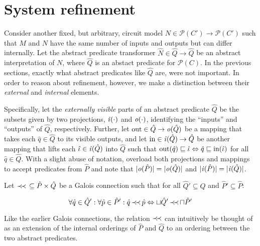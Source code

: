 \section{System refinement}


Consider another fixed, but arbitrary, circuit model $N \in \mathcal{P}(C') \rightarrow \mathcal{P}(C')$ such that $M$ and $N$ have the same number of inputs and outputs but can differ internally. Let the abstract predicate transformer $\hat N \in \hat Q \rightarrow \hat Q$ be an abstract interpretation of $N$, where $\hat Q$ is an abstact predicate for $\mathcal{P}(C)$. In the previous sections, exactly what abstract predicates like $\hat Q$ are, were not important. In order to reason about refinement, however, we  make a distinction between their \textit{external} and \textit{internal} elements.

Specifically, let the \textit{externally visible} parts of an abstract predicate $\hat Q$ be the subsets given by two projections, $\mathit{i}(\cdot)$ and $\mathit{o}(\cdot)$, identifying the ``inputs'' and ``outputs'' of $\hat Q$, respectively. Further, let $\operatorname{out} \in \hat Q \rightarrow \mathit{o}(\hat Q)$ be a mapping that takes each $\hat q \in \hat Q$ to its visible outputs, and let $\operatorname{in} \in \mathit{i}(\hat Q) \rightarrow \hat Q$ be another mapping that lifts each $\hat \iota \in \mathit{i}(\hat Q)$ into $\hat Q$ such that $\operatorname{out}(\hat q) \sqsubseteq \hat \iota \Leftrightarrow \hat q \sqsubseteq \operatorname{in}(\hat \iota)$ for all $\hat q \in \hat Q$. With a slight abuse of notation, overload both projections and mappings to accept predicates from $\hat P$ and note that $| \mathit{o}(\hat P) | = | \mathit{o}(\hat Q) |$ and $| \mathit{i}(\hat P) | = | \mathit{i}(\hat Q) |$.


Let $\operatorname{\prec\mkern-4mu\prec} \, \subseteq \hat P \times \hat Q$ be a Galois connection such that for all $\hat Q' \subseteq \hat Q$ and $\hat P' \subseteq \hat P$:

\begin{equation*}
\forall \hat q \in \hat Q' : \forall \hat p \in \hat P' : \hat q \operatorname{\prec\mkern-4mu\prec} \hat p \Leftrightarrow \sqcup \hat Q' \operatorname{\prec\mkern-4mu\prec} \sqcap \hat P'
\end{equation*}

\noindent Like the earlier Galois connections, the relation $\operatorname{\prec\mkern-4mu\prec}$ can intuitively be thought of as an extension of the internal orderings of $\hat P$ and $\hat Q$ to an ordering between the two abstract predicates. 

